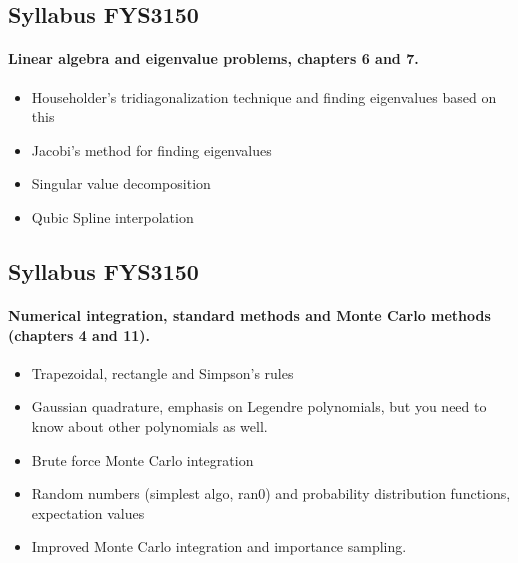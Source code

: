 \documentclass[%
oneside,                 %
final,                   %
10pt]{article}
\begin{document}
\noindent




\subsection{Syllabus FYS3150}


\paragraph{Linear algebra and eigenvalue problems, chapters 6 and 7.}
\begin{itemize}
  \item Householder's tridiagonalization technique and finding eigenvalues based on this

  \item Jacobi's method for finding eigenvalues

  \item Singular value decomposition

  \item Qubic Spline interpolation
\end{itemize}

\noindent




\subsection{Syllabus FYS3150}


\paragraph{Numerical integration, standard methods and Monte Carlo methods (chapters 4 and 11).}
\begin{itemize}
  \item Trapezoidal, rectangle and Simpson's rules

  \item Gaussian quadrature, emphasis on Legendre polynomials, but you need to know about other polynomials as well.

  \item Brute force Monte Carlo integration

  \item Random numbers (simplest algo, ran0) and probability distribution functions, expectation values

  \item Improved Monte Carlo integration and importance sampling.
\end{itemize}
\end{document}
